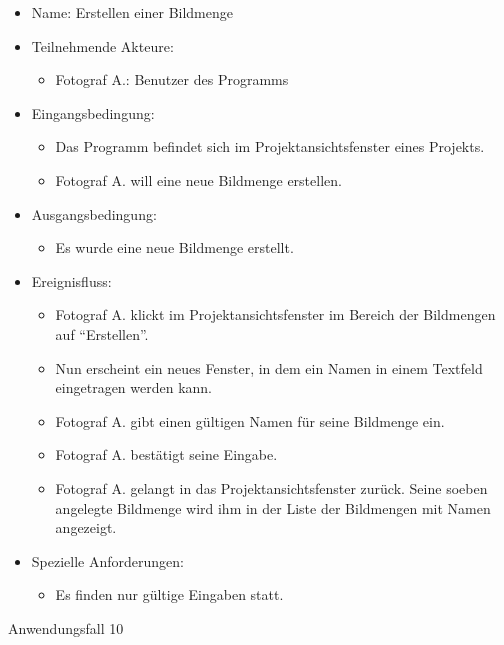 	\begin{itemize}
		\item Name: Erstellen einer Bildmenge
		\item Teilnehmende Akteure:
		\begin{itemize}
			\item	Fotograf A.: Benutzer des Programms		
		\end{itemize}
		\item Eingangsbedingung:
		\begin{itemize}
			\item	Das Programm befindet sich im Projektansichtsfenster eines Projekts.
			\item Fotograf A. will eine neue Bildmenge erstellen.
		\end{itemize}
		\item Ausgangsbedingung:
		\begin{itemize}
			\item	Es wurde eine neue Bildmenge erstellt.	
		\end{itemize}
		\item Ereignisfluss:
		\begin{itemize}
			\item Fotograf A. klickt im Projektansichtsfenster im Bereich der Bildmengen auf "`Erstellen"'.		
			\item Nun erscheint ein neues Fenster, in dem ein Namen in einem Textfeld eingetragen werden kann.
			\item Fotograf A. gibt einen gültigen Namen für seine Bildmenge ein.
			\item Fotograf A. bestätigt seine Eingabe.
			\item Fotograf A. gelangt in das Projektansichtsfenster zurück. Seine soeben angelegte Bildmenge wird ihm in der Liste der Bildmengen mit Namen angezeigt.
		\end{itemize}
		\item Spezielle Anforderungen:
		\begin{itemize}
			\item	Es finden nur gültige Eingaben statt.		
		\end{itemize}			
	\end{itemize}
	
	\begin{description}
		\item[Anwendungsfall 10]
	\end{description}
	
